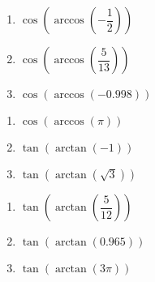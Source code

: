 \begin{multicols}{3}

\begin{enumerate}

\setcounter{enumi}{\value{HW}}

\item $\cos\left(\arccos\left(-\dfrac{1}{2}\right)\right)$
\item $\cos\left(\arccos\left(\dfrac{5}{13}\right)\right)$
\item $\cos\left(\arccos\left(-0.998\right)\right)$ 

\setcounter{HW}{\value{enumi}}

\end{enumerate}

\end{multicols}

\begin{multicols}{3}

\begin{enumerate}

\setcounter{enumi}{\value{HW}}

\item $\cos\left(\arccos\left(\pi \right)\right)$
\item $\tan\left(\arctan\left(-1\right)\right)$
\item $\tan\left(\arctan\left(\sqrt{3}\right)\right)$

\setcounter{HW}{\value{enumi}}

\end{enumerate}

\end{multicols}

\begin{multicols}{3}

\begin{enumerate}

\setcounter{enumi}{\value{HW}}

\item $\tan\left(\arctan\left(\dfrac{5}{12}\right)\right)$
\item $\tan\left(\arctan\left(0.965\right)\right)$ 
\item $\tan\left(\arctan\left( 3\pi \right)\right)$ 

\setcounter{HW}{\value{enumi}}

\end{enumerate}

\end{multicols}

